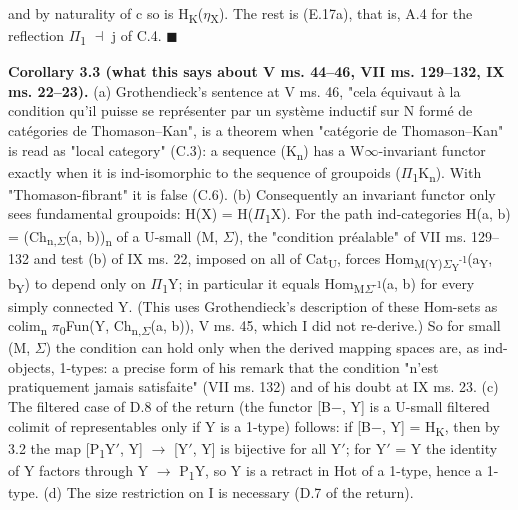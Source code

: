 and by naturality of c so is H\textsubscript{K}(\ensuremath{\eta}\textsubscript{X}). The rest is (E.17a), that is, A.4 for the reflection \ensuremath{\Pi}\textsubscript{1} \ensuremath{\dashv} j of C.4. \ensuremath{\blacksquare}

\textbf{Corollary 3.3 (what this says about V ms. 44--46, VII ms. 129--132, IX ms. 22--23).} (a) Grothendieck's sentence at V ms. 46, "cela équivaut à la condition qu'il puisse se représenter par un système inductif sur N formé de catégories de Thomason--Kan", is a theorem when "catégorie de Thomason--Kan" is read as "local category" (C.3): a sequence (K\textsubscript{n}) has a W\ensuremath{\infty}-invariant functor exactly when it is ind-isomorphic to the sequence of groupoids (\ensuremath{\Pi}\textsubscript{1}K\textsubscript{n}). With "Thomason-fibrant" it is false (C.6). (b) Consequently an invariant functor only sees fundamental groupoids: H(X) = H(\ensuremath{\Pi}\textsubscript{1}X). For the path ind-categories H(a, b) = (Ch\textsubscript{n,\ensuremath{\Sigma}}(a, b))\textsubscript{n} of a U-small (M, \ensuremath{\Sigma}), the "condition préalable" of VII ms. 129--132 and test (b) of IX ms. 22, imposed on all of Cat\textsubscript{U}, forces Hom\textsubscript{M(Y)\ensuremath{\Sigma}\textsubscript{Y}\textsuperscript{-1}}(a\textsubscript{Y}, b\textsubscript{Y}) to depend only on \ensuremath{\Pi}\textsubscript{1}Y; in particular it equals Hom\textsubscript{M\ensuremath{\Sigma}\textsuperscript{-1}}(a, b) for every simply connected Y. (This uses Grothendieck's description of these Hom-sets as colim\textsubscript{n} \ensuremath{\pi}\textsubscript{0}Fun(Y, Ch\textsubscript{n,\ensuremath{\Sigma}}(a, b)), V ms. 45, which I did not re-derive.) So for small (M, \ensuremath{\Sigma}) the condition can hold only when the derived mapping spaces are, as ind-objects, 1-types: a precise form of his remark that the condition "n'est pratiquement jamais satisfaite" (VII ms. 132) and of his doubt at IX ms. 23. (c) The filtered case of D.8 of the return (the functor [B\ensuremath{-}, Y] is a U-small filtered colimit of representables only if Y is a 1-type) follows: if [B\ensuremath{-}, Y] = H\textsubscript{K}, then by 3.2 the map [P\textsubscript{1}Y\ensuremath{\prime}, Y] \ensuremath{\to} [Y\ensuremath{\prime}, Y] is bijective for all Y\ensuremath{\prime}; for Y\ensuremath{\prime} = Y the identity of Y factors through Y \ensuremath{\to} P\textsubscript{1}Y, so Y is a retract in Hot of a 1-type, hence a 1-type. (d) The size restriction on I is necessary (D.7 of the return).


